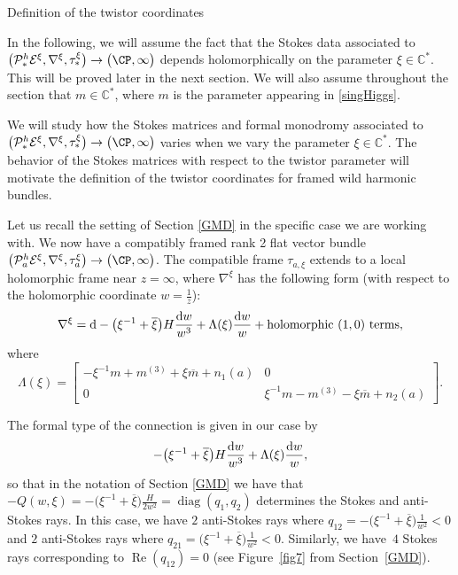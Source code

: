\begin{subsubsection} {Definition of the twistor coordinates}\label{deftwistcoords}

In the following, we will assume the fact that the Stokes data associated to $\bigl(\mathcal{P}^h_*\mathcal{E}^{\xi},\nabla^{\xi}, \tau_{*}^{\xi}\bigr)\to \bigl(\CP,\infty\bigr)$ depends holomorphically on the parameter $\xi \in \mathbb{C}^*$. This will be proved later in the next section. We will also assume throughout the section that $m\in \mathbb{C}^{*}$, where $m$ is the parameter appearing in \eqref{singHiggs}.

We will study how the Stokes matrices and formal monodromy associated to $\bigl(\mathcal{P}^h_*\mathcal{E}^{\xi},\nabla^{\xi}, \tau_{*}^{\xi}\bigr)\to \bigl(\CP,\infty\bigr)$ varies when we vary the parameter $\xi \in \mathbb{C}^*$. The behavior of the Stokes matrices with respect to the twistor parameter will motivate the definition of the twistor coordinates for framed wild harmonic bundles.

Let us recall the setting of Section \ref{GMD} in the specific case we are working with. We now have a compatibly framed rank 2 flat vector bundle $\bigl(\mathcal{P}^h_a\mathcal{E}^{\xi},\nabla^{\xi}, \tau_{a}^{\xi}\bigr)\to \bigl(\CP,\infty\bigr)$. The compatible frame $\tau_{a,\xi}$ extends to a local holomorphic frame near $z=\infty$, where $\nabla^{\xi}$ has the following form (with respect to the holomorphic coordinate $w=\frac1z$):
\begin{equation*}
 \nabla^{\xi}={\rm d} -\bigl(\xi^{-1}+\overline{\xi}\bigr)H\frac{{\rm d}w}{w^3}+\Lambda(\xi)\frac{{\rm d}w}{w} + \text{holomorphic $(1,0)$ terms},
\end{equation*}
where
\begin{equation}\label{formmon}
 \Lambda(\xi)=\begin{bmatrix}-\xi^{-1}m +m^{(3)}+\xi \overline{m} +n_1(a) & 0\\
 0& \xi^{-1}m -m^{(3)}-\xi \overline{m} +n_2(a)
 \end{bmatrix}.
\end{equation}

The formal type of the connection is given in our case by
\begin{equation}\label{formtype}
 -\bigl(\xi^{-1}+\overline{\xi}\bigr)H\frac{{\rm d}w}{w^3}+\Lambda(\xi)\frac{{\rm d}w}{w},
\end{equation}
so that in the notation of Section \ref{GMD} we have that $-Q(w,\xi)=-\bigl(\xi^{-1}+\overline{\xi}\bigr)\frac{H}{2w^2}=\operatorname{diag}(q_1,q_2)$ determines the Stokes and anti-Stokes rays. In this case, we have $2$ anti-Stokes rays where $q_{12}=-\bigl(\xi^{-1}+\overline{\xi}\bigr)\frac{1}{w^2}<0$ and $2$ anti-Stokes rays where $q_{21}=\bigl(\xi^{-1}+\overline{\xi}\bigr)\frac{1}{w^2}<0$. Similarly, we have~$4$ Stokes rays corresponding to $\operatorname{Re}(q_{12})=0$ (see Figure~\ref{fig7} from Section~\ref{GMD}).


\end{subsubsection}
